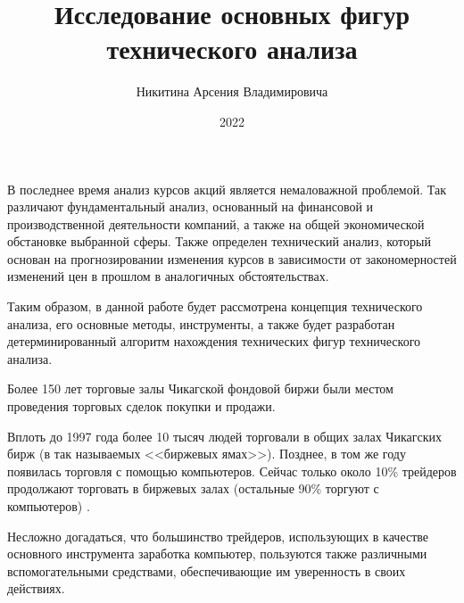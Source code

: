 \documentclass[bachelor, och, coursework]{SCWorks}
\begin{document}

\title{Исследование основных фигур технического анализа}





\author{Никитина Арсения Владимировича}




\date{2022}

\maketitle


\tableofcontents

\intro
    В последнее время анализ курсов акций является немаловажной проблемой.
    Так различают фундаментальный анализ, основанный на финансовой и
    производственной деятельности компаний, а также на общей экономической
    обстановке выбранной сферы. Также определен технический анализ, который
    основан на прогнозировании изменения курсов в зависимости от
    закономерностей изменений цен в прошлом в аналогичных обстоятельствах.

    Таким образом, в данной работе будет рассмотрена концепция технического
    анализа, его основные методы, инструменты, а также будет разработан
    детерминированный алгоритм нахождения технических фигур технического
    анализа.
    
    Более 150 лет торговые залы Чикагской фондовой биржи были местом проведения
    торговых сделок покупки и продажи.

    Вплоть до 1997 года более 10 тысяч людей торговали в общих залах Чикагских
    бирж (в так называемых <<биржевых ямах>>). Позднее, в том же году появилась
    торговля с помощью компьютеров. Сейчас только около 10\% трейдеров
    продолжают торговать в биржевых залах (остальные 90\% торгуют с
    компьютеров) \cite{HIST}.

    Несложно догадаться, что большинство трейдеров, использующих в качестве
    основного инструмента заработка компьютер, пользуются также различными
    вспомогательными средствами, обеспечивающие им уверенность в своих
    действиях.
\end{document}
